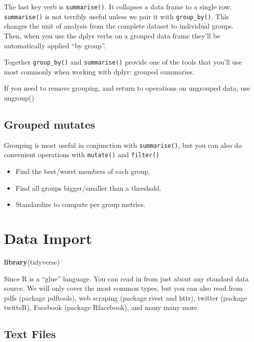 \documentclass[]{book}
\newenvironment{Shaded}{\begin{snugshade}}{\end{snugshade}}
\newcommand{\KeywordTok}[1]{\textcolor[rgb]{0.13,0.29,0.53}{\textbf{#1}}}
\newcommand{\NormalTok}[1]{#1}
\providecommand{\tightlist}{%
  \setlength{\itemsep}{0pt}\setlength{\parskip}{0pt}}
\theoremstyle{definition}
\theoremstyle{definition}
\theoremstyle{definition}
\theoremstyle{remark}
\let\BeginKnitrBlock\begin \let\EndKnitrBlock\end
\begin{document}
The last key verb is \texttt{summarise()}. It collapses a data frame to
a single row. \texttt{summarise()} is not terribly useful unless we pair
it with \texttt{group\_by()}. This changes the unit of analysis from the
complete dataset to individual groups. Then, when you use the dplyr
verbs on a grouped data frame they'll be automatically applied ``by
group''.

Together \texttt{group\_by()} and \texttt{summarise()} provide one of
the tools that you'll use most commonly when working with dplyr: grouped
summaries.

\BeginKnitrBlock{rmdimportant}
If you need to remove grouping, and return to operations on ungrouped
data, use ungroup()
\EndKnitrBlock{rmdimportant}

\section{Grouped mutates}\label{grouped-mutates}

Grouping is most useful in conjunction with \texttt{summarise()}, but
you can also do convenient operations with \texttt{mutate()} and
\texttt{filter()}

\begin{itemize}
\tightlist
\item
  Find the best/worst members of each group.
\item
  Find all groups bigger/smaller than a threshold.
\item
  Standardize to compute per group metrics.
\end{itemize}

\chapter{Data Import}\label{data-import}

\begin{Shaded}
\begin{Highlighting}[]
\KeywordTok{library}\NormalTok{(tidyverse)}
\end{Highlighting}
\end{Shaded}

Since R is a ``glue'' language. You can read in from just about any
standard data source. We will only cover the most common types, but you
can also read from pdfs (package pdftools), web scraping (package rvest
and httr), twitter (package twitteR), Facebook (package Rfacebook), and
many many more.

\section{Text Files}\label{text-files}
\end{document}
